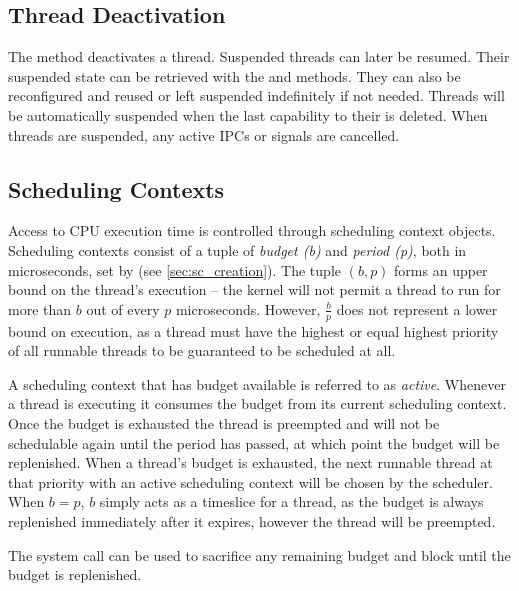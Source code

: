\subsection{Thread Deactivation}
\label{sec:thread_deactivation}

The  method deactivates a thread.
Suspended threads can later be resumed.
Their suspended state can be retrieved with the 
 and
 methods.
They can also be reconfigured and
reused or left suspended indefinitely if not needed. Threads will be
automatically suspended when the last capability to their  is
deleted.
When threads are suspended, any active IPCs or signals are cancelled.

\subsection{Scheduling Contexts}
\label{sec:scheduling_contexts}

Access to CPU execution time is controlled through scheduling context objects.
Scheduling contexts consist of a tuple of 
\textit{budget (b)} and \textit{period (p)}, both in microseconds, set by  (see \autoref{sec:sc_creation}).
The tuple $(b, p)$ forms an upper bound on the thread's execution -- 
the kernel will not permit a thread to run for more than $b$ out of every $p$ microseconds.
However, $\frac{b}{p}$ does not represent a lower bound on execution, as a thread must have the highest or equal highest priority of all runnable threads to be guaranteed to be scheduled at all.

A scheduling context that has budget available is referred to as \emph{active}.
Whenever a thread is executing it consumes the budget from its current scheduling context.
Once the budget is exhausted the thread is preempted and will not be schedulable again until the period has passed, at which 
point the budget will be replenished.
When a thread's budget is exhausted, the next runnable thread at that priority with an active scheduling context will be chosen by the scheduler.
When $b = p$, $b$ simply acts as a timeslice for a thread, as the budget is always replenished immediately after it expires, however the thread will be preempted.

The system call  can be used to sacrifice any remaining budget and block until the budget is replenished.


